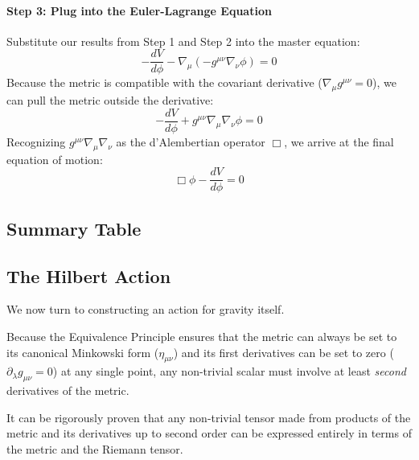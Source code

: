 \documentclass[11pt, a4paper]{report}
\begin{document}
\paragraph{Step 3: Plug into the Euler-Lagrange Equation}
Substitute our results from Step 1 and Step 2 into the master equation:
\begin{equation}
    - \frac{dV}{d\phi} - \nabla_\mu \left( -g^{\mu\nu} \nabla_\nu \phi \right) = 0
\end{equation}
Because the metric is compatible with the covariant derivative ($\nabla_\mu g^{\mu\nu} = 0$), we can pull the metric outside the derivative:
\begin{equation}
    - \frac{dV}{d\phi} + g^{\mu\nu} \nabla_\mu \nabla_\nu \phi = 0
\end{equation}
Recognizing $g^{\mu\nu} \nabla_\mu \nabla_\nu$ as the d'Alembertian operator $\Box$, we arrive at the final equation of motion:
\begin{equation}
    \Box \phi - \frac{dV}{d\phi} = 0
\end{equation}

\subsection*{Summary Table}



\subsection{The Hilbert Action}

We now turn to constructing an action for gravity itself. %

Because the Equivalence Principle ensures that the metric can always be set to its canonical Minkowski form ($\eta_{\mu\nu}$) and its first derivatives can be set to zero ($\partial_{\lambda}g_{\mu\nu} = 0$) at any single point, any non-trivial scalar must involve at least \textit{second} derivatives of the metric. %

It can be rigorously proven that any non-trivial tensor made from products of the metric and its derivatives up to second order can be expressed entirely in terms of the metric and the Riemann tensor. %
\end{document}

